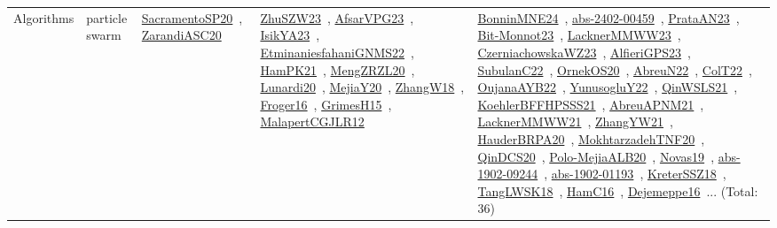 {\begin{longtable}{lp{3cm}>{\raggedright\arraybackslash}p{6cm}>{\raggedright\arraybackslash}p{6cm}>{\raggedright\arraybackslash}p{8cm}}
Algorithms & particle swarm & \href{../works/SacramentoSP20.pdf}{SacramentoSP20}~\cite{SacramentoSP20}, \href{../works/ZarandiASC20.pdf}{ZarandiASC20}~\cite{ZarandiASC20} & \href{../works/ZhuSZW23.pdf}{ZhuSZW23}~\cite{ZhuSZW23}, \href{../works/AfsarVPG23.pdf}{AfsarVPG23}~\cite{AfsarVPG23}, \href{../works/IsikYA23.pdf}{IsikYA23}~\cite{IsikYA23}, \href{../works/EtminaniesfahaniGNMS22.pdf}{EtminaniesfahaniGNMS22}~\cite{EtminaniesfahaniGNMS22}, \href{../works/HamPK21.pdf}{HamPK21}~\cite{HamPK21}, \href{../works/MengZRZL20.pdf}{MengZRZL20}~\cite{MengZRZL20}, \href{../works/Lunardi20.pdf}{Lunardi20}~\cite{Lunardi20}, \href{../works/MejiaY20.pdf}{MejiaY20}~\cite{MejiaY20}, \href{../works/ZhangW18.pdf}{ZhangW18}~\cite{ZhangW18}, \href{../works/Froger16.pdf}{Froger16}~\cite{Froger16}, \href{../works/GrimesH15.pdf}{GrimesH15}~\cite{GrimesH15}, \href{../works/MalapertCGJLR12.pdf}{MalapertCGJLR12}~\cite{MalapertCGJLR12} & \href{../works/BonninMNE24.pdf}{BonninMNE24}~\cite{BonninMNE24}, \href{../works/abs-2402-00459.pdf}{abs-2402-00459}~\cite{abs-2402-00459}, \href{../works/PrataAN23.pdf}{PrataAN23}~\cite{PrataAN23}, \href{../works/Bit-Monnot23.pdf}{Bit-Monnot23}~\cite{Bit-Monnot23}, \href{../works/LacknerMMWW23.pdf}{LacknerMMWW23}~\cite{LacknerMMWW23}, \href{../works/CzerniachowskaWZ23.pdf}{CzerniachowskaWZ23}~\cite{CzerniachowskaWZ23}, \href{../works/AlfieriGPS23.pdf}{AlfieriGPS23}~\cite{AlfieriGPS23}, \href{../works/SubulanC22.pdf}{SubulanC22}~\cite{SubulanC22}, \href{../works/OrnekOS20.pdf}{OrnekOS20}~\cite{OrnekOS20}, \href{../works/AbreuN22.pdf}{AbreuN22}~\cite{AbreuN22}, \href{../works/ColT22.pdf}{ColT22}~\cite{ColT22}, \href{../works/OujanaAYB22.pdf}{OujanaAYB22}~\cite{OujanaAYB22}, \href{../works/YunusogluY22.pdf}{YunusogluY22}~\cite{YunusogluY22}, \href{../works/QinWSLS21.pdf}{QinWSLS21}~\cite{QinWSLS21}, \href{../works/KoehlerBFFHPSSS21.pdf}{KoehlerBFFHPSSS21}~\cite{KoehlerBFFHPSSS21}, \href{../works/AbreuAPNM21.pdf}{AbreuAPNM21}~\cite{AbreuAPNM21}, \href{../works/LacknerMMWW21.pdf}{LacknerMMWW21}~\cite{LacknerMMWW21}, \href{../works/ZhangYW21.pdf}{ZhangYW21}~\cite{ZhangYW21}, \href{../works/HauderBRPA20.pdf}{HauderBRPA20}~\cite{HauderBRPA20}, \href{../works/MokhtarzadehTNF20.pdf}{MokhtarzadehTNF20}~\cite{MokhtarzadehTNF20}, \href{../works/QinDCS20.pdf}{QinDCS20}~\cite{QinDCS20}, \href{../works/Polo-MejiaALB20.pdf}{Polo-MejiaALB20}~\cite{Polo-MejiaALB20}, \href{../works/Novas19.pdf}{Novas19}~\cite{Novas19}, \href{../works/abs-1902-09244.pdf}{abs-1902-09244}~\cite{abs-1902-09244}, \href{../works/abs-1902-01193.pdf}{abs-1902-01193}~\cite{abs-1902-01193}, \href{../works/KreterSSZ18.pdf}{KreterSSZ18}~\cite{KreterSSZ18}, \href{../works/TangLWSK18.pdf}{TangLWSK18}~\cite{TangLWSK18}, \href{../works/HamC16.pdf}{HamC16}~\cite{HamC16}, \href{../works/Dejemeppe16.pdf}{Dejemeppe16}~\cite{Dejemeppe16}... (Total: 36)\\

\end{longtable}}
